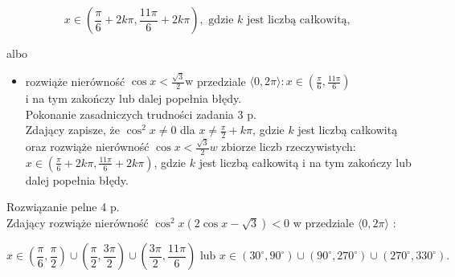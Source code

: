 \documentclass[10pt]{article}
\begin{document}
$$
x \in\left(\frac{\pi}{6}+2 k \pi, \frac{11 \pi}{6}+2 k \pi\right), \text { gdzie } k \text { jest liczbą całkowitą, }
$$

albo

\begin{itemize}
  \item rozwiąże nierówność $\cos x<\frac{\sqrt{3}}{2} \mathrm{w}$ przedziale $\langle 0,2 \pi\rangle: x \in\left(\frac{\pi}{6}, \frac{11 \pi}{6}\right)$\\
i na tym zakończy lub dalej popełnia błędy.\\
Pokonanie zasadniczych trudności zadania 3 p.\\
Zdający zapisze, że $\cos ^{2} x \neq 0$ dla $x \neq \frac{\pi}{2}+k \pi$, gdzie $k$ jest liczbą całkowitą oraz rozwiąże nierówność $\cos x<\frac{\sqrt{3}}{2} w$ zbiorze liczb rzeczywistych: $x \in\left(\frac{\pi}{6}+2 k \pi, \frac{11 \pi}{6}+2 k \pi\right)$, gdzie $k$ jest liczbą całkowitą i na tym zakończy lub dalej popełnia błędy.
\end{itemize}

Rozwiązanie pelne 4 p.\\
Zdający rozwiąże nierówność $\cos ^{2} x(2 \cos x-\sqrt{3})<0$ w przedziale $\langle 0,2 \pi\rangle$ :

$$
x \in\left(\frac{\pi}{6}, \frac{\pi}{2}\right) \cup\left(\frac{\pi}{2}, \frac{3 \pi}{2}\right) \cup\left(\frac{3 \pi}{2}, \frac{11 \pi}{6}\right) \text { lub } x \in\left(30^{\circ}, 90^{\circ}\right) \cup\left(90^{\circ}, 270^{\circ}\right) \cup\left(270^{\circ}, 330^{\circ}\right) .
$$
\end{document}
